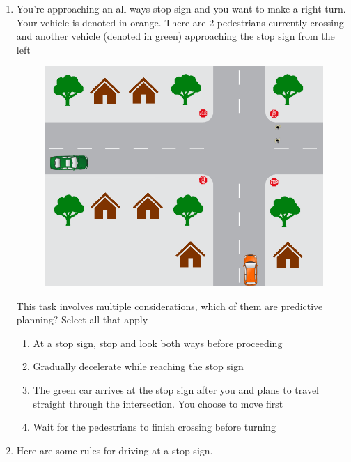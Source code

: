 \begin{enumerate}
\item You’re approaching an all ways stop sign and you want to make a right turn. Your vehicle is denoted in orange. There are 2 pedestrians currently crossing and another vehicle (denoted in green) approaching the stop sign from the left

\begin{figure}[!htb]
\begin{center}
\includegraphics[scale=0.280]{img/intro_self_driving/summary_question_scenario_2.png}
\end{center}
\label{summary_question_scenario_2}
\end{figure}

This task involves multiple considerations, which of them are predictive planning? Select all that apply

\begin{enumerate}
\item At a stop sign, stop and look both ways before proceeding
\item Gradually decelerate while reaching the stop sign
\item The green car arrives at the stop sign after you and plans to travel straight through the intersection. 
You choose to move first
\item Wait for the pedestrians to finish crossing before turning
\end{enumerate}


\item Here are some rules for driving at a stop sign. 



\end{enumerate}
